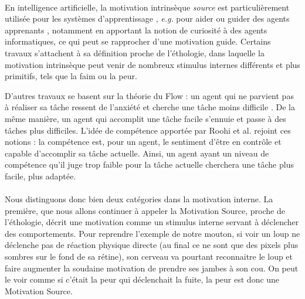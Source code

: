         
        \paragraph{}
        En intelligence artificielle, la motivation intrinsèque \textit{source} est particulièrement utilisée pour les systèmes d'apprentissage \cite{schmidhuber_formal_2010}, \textit{e.g.} pour aider ou guider des agents apprenants \cite{baldassarre_intrinsically_2013}, notamment en apportant la notion de curiosité à des agents informatiques, ce qui peut se rapprocher d'une motivation guide. Certains travaux  \cite{carbonell_multi-agent_1994, maes_agent_1991} s'attachent à sa définition proche de l'éthologie, dans laquelle la motivation intrinsèque peut venir de nombreux stimulus internes différents et plus primitifs, tels que la faim ou la peur.
        
        D'autres travaux se basent sur la théorie du Flow : un agent qui ne parvient pas à réaliser sa tâche ressent de l'anxiété et cherche une tâche moins difficile \cite{cornudella_how_2015}. De la même manière, un agent qui accomplit une tâche facile s'ennuie et passe à des tâches plus difficiles. L'idée de compétence apportée par Roohi et al. \cite{roohi_review_2018} rejoint ces notions : la compétence est, pour un agent, le sentiment d'être en contrôle et capable d'accomplir sa tâche actuelle. Ainsi, un agent ayant un niveau de compétence qu'il juge trop faible pour la tâche actuelle cherchera une tâche plus facile, plus adaptée.
        
        \paragraph{}
        Nous distinguons donc bien deux catégories dans la motivation interne. La première, que nous allons continuer à appeler la Motivation Source, proche de l'éthologie, décrit une motivation comme un stimulus interne servant à déclencher des comportements. Pour reprendre l'exemple de notre mouton, si voir un loup ne déclenche pas de réaction physique directe (au final ce ne sont que des pixels plus sombres sur le fond de sa rétine), son cerveau va pourtant reconnaitre le loup et faire augmenter la soudaine motivation de prendre ses jambes à son cou. On peut le voir comme si c'était la peur qui déclenchait la fuite, la peur est donc une Motivation Source.
        
